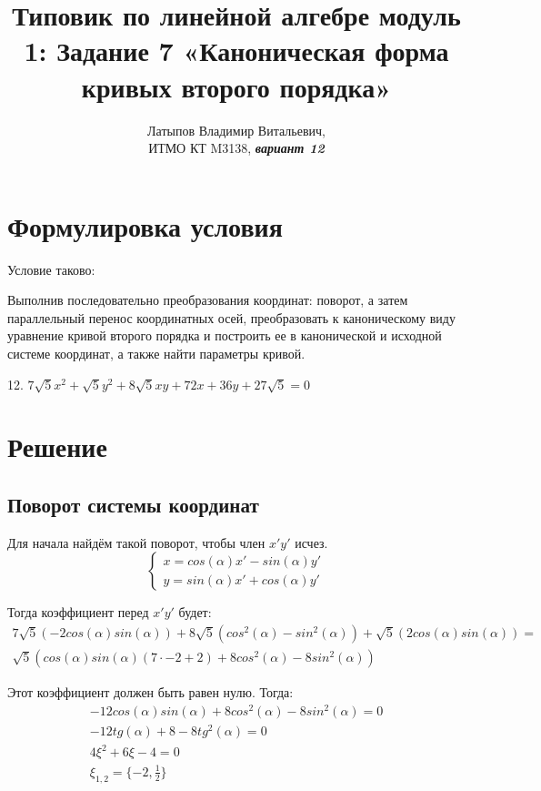 \documentclass[12pt, a4paper]{article}
\author{Латыпов Владимир Витальевич, \\ ИТМО КТ M3138, \Huge{\textit{\textbf{вариант 12}}}}
\title{Типовик по линейной алгебре модуль 1: Задание 7 «Каноническая форма кривых второго порядка»}
\begin{document}
    \tittoc

    \section{Формулировка условия}

    \begin{statement}
        Условие таково: 
        
        Выполнив последовательно преобразования координат: поворот, а
        затем параллельный перенос координатных осей, преобразовать к
        каноническому виду уравнение кривой второго порядка и построить ее в
        канонической и исходной системе координат, а также найти параметры
        кривой.

        12. $7\sqrt{5} x^2 + \sqrt{5}y^2 + 8\sqrt{5}xy + 72x + 36y + 27\sqrt{5} = 0$
    \end{statement}

    \section{Решение}


    \subsection{Поворот системы координат}
    
    Для начала найдём такой поворот, чтобы член $x'y'$ исчез.
    \begin{equation}
        \begin{cases}
            x = cos(\alpha) x' - sin(\alpha) y' \\
            y = sin(\alpha) x' + cos(\alpha) y'
        \end{cases}
    \end{equation}

    Тогда коэффициент перед $x'y'$ будет:
    \begin{multline}
        7\sqrt{5} \left( -2 cos(\alpha) sin(\alpha) \right) + 8\sqrt{5} \left( cos^2(\alpha) - sin^2(\alpha) \right) + \sqrt{5} \left( 2 cos(\alpha) sin(\alpha) \right) = \\
        \sqrt{5} ( cos(\alpha) sin(\alpha) (7 \cdot -2 + 2) + 8 cos^2(\alpha) - 8 sin^2(\alpha) )
    \end{multline}

    Этот коэффициент должен быть равен нулю. Тогда:
    \begin{gather}
        -12 cos(\alpha) sin(\alpha) + 8cos^2(\alpha) - 8sin^2(\alpha) = 0 \\
        -12tg(\alpha) + 8 - 8tg^2(\alpha) = 0 \\
        4\xi^2 + 6\xi - 4 = 0 \\
        \xi_{1, 2} = \{ -2, \frac{1}{2} \}
    \end{gather}
\end{document}
